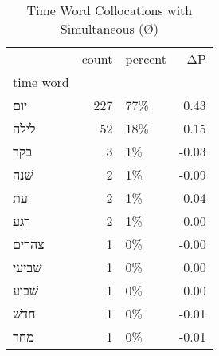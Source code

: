 \begin{table}[htbp!]
\centering
\caption{Time Word Collocations with Simultaneous (Ø)}
\label{table:simØ_head_cpd}
\begin{tabular}{lrlr}
\toprule
{} &  count & percent &    ΔP \\
time word &        &         &       \\
\midrule
יום       &    227 &     77\% &  0.43 \\
לילה      &     52 &     18\% &  0.15 \\
בקר       &      3 &      1\% & -0.03 \\
שׁנה      &      2 &      1\% & -0.09 \\
עת        &      2 &      1\% & -0.04 \\
רגע       &      2 &      1\% &  0.00 \\
צהרים     &      1 &      0\% & -0.00 \\
שׁביעי    &      1 &      0\% &  0.00 \\
שׁבוע     &      1 &      0\% &  0.00 \\
חדשׁ      &      1 &      0\% & -0.01 \\
מחר       &      1 &      0\% & -0.01 \\
\bottomrule
\end{tabular}
\end{table}
